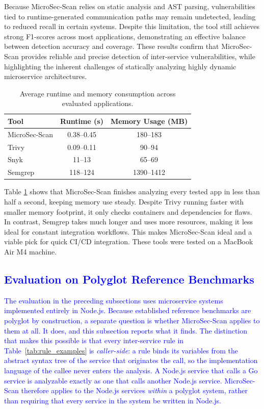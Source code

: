 \documentclass[preprint,12pt]{elsarticle}
\newcommand{\new}[1]{\textcolor{blue}{#1}}
\newcommand{\safefixtablestyle}{%
  \small
  \setlength{\tabcolsep}{5pt}
  \renewcommand{\arraystretch}{1.15}
}
\begin{document}
Because MicroSec-Scan relies on static analysis and AST parsing, vulnerabilities tied to runtime-generated communication paths may remain undetected, leading to reduced recall in certain systems. Despite this limitation, the tool still achieves strong F1-scores across most applications, demonstrating an effective balance between detection accuracy and coverage. These results confirm that MicroSec-Scan provides reliable and precise detection of inter-service vulnerabilities, while highlighting the inherent challenges of statically analyzing highly dynamic microservice architectures.

\begin{table}[!t]
\centering
\caption{Average runtime and memory consumption across evaluated applications.}
\label{tab:resource_consumption}
\safefixtablestyle
\begin{tabular}{@{} l c c @{}}
\toprule
\textbf{Tool} & \textbf{Runtime (s)} & \textbf{Memory Usage (MB)} \\
\midrule
MicroSec-Scan & 0.38--0.45 & 180--183 \\
Trivy & 0.09--0.11 & 90--94 \\
Snyk & 11--13 & 65--69 \\
Semgrep & 118--124 & 1390--1412 \\
\bottomrule
\end{tabular}
\end{table}


Table \ref{tab:resource_consumption} shows that MicroSec-Scan finishes analyzing every tested app in less than half a second, keeping memory use steady. Despite Trivy running faster with smaller memory footprint, it only checks containers and dependencies for flaws. In contrast, Semgrep takes much longer and uses more resources, making it less ideal for constant integration workflows.
This makes MicroSec-Scan ideal and a viable pick for quick CI/CD integration. These tools were tested on a MacBook Air M4 machine.



\subsection{\new{Evaluation on Polyglot Reference Benchmarks}}
\label{sec:polyglot_eval}

\new{The evaluation in the preceding subsections uses microservice systems
implemented entirely in Node.js. Because established reference benchmarks are
polyglot by construction, a separate question is whether MicroSec-Scan applies
to them at all. It does, and this subsection reports what it finds. The
distinction that makes this possible is that every inter-service rule in
Table~\ref{tab:rule_examples} is \emph{caller-side}: a rule binds its
variables from the abstract syntax tree of the service that originates the
call, so the implementation language of the callee never enters the analysis.
A Node.js service that calls a Go service is analyzable exactly as one that
calls another Node.js service. MicroSec-Scan therefore applies to the Node.js
services \emph{within} a polyglot system, rather than requiring that every
service in the system be written in Node.js.}
\end{document}
